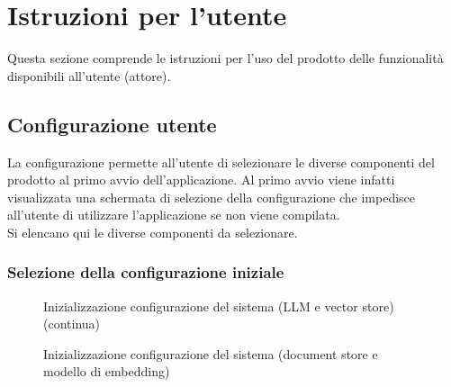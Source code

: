\documentclass[10pt, a4paper]{article}
\begin{document}
\newpage
\section{Istruzioni per l'utente}
Questa sezione comprende le istruzioni per l'uso del prodotto delle funzionalità disponibili all'utente (attore).
\subsection{Configurazione utente}
La configurazione permette all'utente di selezionare le diverse componenti del prodotto al primo avvio dell'applicazione. Al primo avvio viene infatti visualizzata una schermata di selezione della configurazione che impedisce all'utente di utilizzare l'applicazione se non viene compilata.\\ Si elencano qui le diverse componenti da selezionare.
\subsubsection{Selezione della configurazione iniziale}
\begin{figure}[H]
    \centering   
    \caption{Inizializzazione configurazione del sistema (LLM e vector store) (continua)}
    \label{img:configuration1}
\end{figure}
\begin{figure}[H]
    \centering  
    \caption{Inizializzazione configurazione del sistema (document store e modello di embedding)}
    \label{img:configuration2}
\end{figure}
\end{document}

